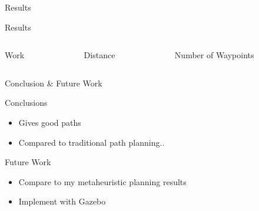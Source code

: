 \documentclass[xcolor=table, 9pt]{beamer}
\begin{document}
\begin{section}{Results}
\begin{frame}{Results}
\begin{columns}
\begin{column}{0.33\textwidth}
\begin{block}{Work}
\begin{center}
                \end{center}
            \end{block}
        \end{column}
        \begin{column}{0.33\textwidth}
            \begin{block}{Distance}
                \begin{center}
                \end{center}
            \end{block}
        \end{column}
        \begin{column}{0.33\textwidth}
            \begin{block}{Number of Waypoints}
                \begin{center}
                \end{center}
            \end{block}
        \end{column}
    \end{columns}
\end{frame}
\end{section}

\begin{section}{Conclusion \& Future Work}
\begin{frame}{Conclusions}
    \begin{itemize}
        \item Gives good paths
        \item Compared to traditional path planning..
    \end{itemize}
\end{frame}
\begin{frame}{Future Work}
    \begin{itemize}
        \item Compare to my metaheuristic planning results
        \item Implement with Gazebo
    \end{itemize}    
\end{frame}
\end{section}
\end{document}
